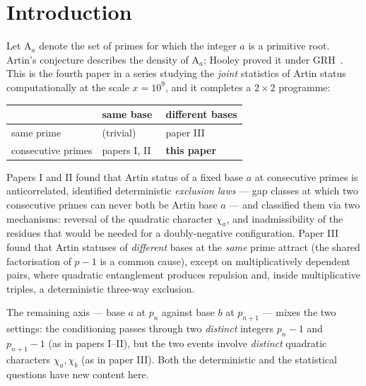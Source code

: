 \documentclass[11pt,reqno]{amsart}
\theoremstyle{plain}
\theoremstyle{definition}
\newcommand{\Art}{\mathrm{A}}
\begin{document}
\maketitle

\section{Introduction}
\label{sec:intro}

Let $\Art_a$ denote the set of primes for which the integer $a$ is a
primitive root. Artin's conjecture describes the density of $\Art_a$; Hooley
proved it under GRH~\cite{Hooley1967}. This is the fourth paper in a series
studying the \emph{joint} statistics of Artin status computationally at the
scale $x = 10^9$, and it completes a $2 \times 2$ programme:

\begin{center}
\begin{tabular}{lll}
\toprule
 & same base & different bases \\
\midrule
same prime & (trivial) & paper III~\cite{BaldIII} \\
consecutive primes & papers I, II~\cite{BaldI, BaldII} & \textbf{this paper} \\
\bottomrule
\end{tabular}
\end{center}

Papers I and II found that Artin status of a fixed base $a$ at consecutive
primes is anticorrelated, identified deterministic \emph{exclusion laws} ---
gap classes at which two consecutive primes can never both be Artin base $a$
--- and classified them via two mechanisms: reversal of the quadratic
character $\chi_a$, and inadmissibility of the residues that would be needed
for a doubly-negative configuration. Paper III found that Artin statuses of
\emph{different} bases at the \emph{same} prime attract (the shared
factorisation of $p-1$ is a common cause), except on multiplicatively
dependent pairs, where quadratic entanglement produces repulsion and, inside
multiplicative triples, a deterministic three-way exclusion.

The remaining axis --- base $a$ at $p_n$ against base $b$ at $p_{n+1}$ ---
mixes the two settings: the conditioning passes through two \emph{distinct}
integers $p_n - 1$ and $p_{n+1} - 1$ (as in papers I--II), but the two events
involve \emph{distinct} quadratic characters $\chi_a, \chi_b$ (as in paper
III). Both the deterministic and the statistical questions have new content
here.
\end{document}
